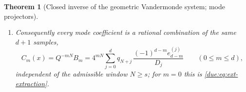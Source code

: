\documentclass[11pt,oneside]{article}
\theoremstyle{plain}
\newtheorem{theorem}{Theorem}[section]
\theoremstyle{definition}
\theoremstyle{remark}
\newcommand{\upn}[1]{\RvachevUp_{#1}}
\newcommand{\Qq}{Q}                                         %
\newcommand{\Cr}[2]{C_{#1}\!\left(#2\right)}                %
\newcommand{\qn}[1]{q_{#1}}                                 %
\begin{document}
\begin{theorem}[Closed inverse of the geometric Vandermonde system; mode projectors]
\begin{enumerate}
\begin{equation}
  =\sum_{a=0}^{m}\sum_{b=0}^{d-m}(-1)^{a+b}\,
  \Qq^{\binom{a}{2}+\binom{b}{2}+(m+1)b}\,
  \GaussianBinomial{m}{a}{\Qq}\GaussianBinomial{d-m}{b}{\Qq}\;
  \qn{N+d-a-b}.
  \label{due:eq:rec-projector-expanded}
 \end{equation}
\item\label{due:it:rec-modes}
 Consequently every mode coefficient is a rational combination of the same
 $d+1$ samples,
 \begin{equation}
  \Cr{m}{x}=\Qq^{-mN}B_{m}
  =4^{mN}\sum_{j=0}^{d}\qn{N+j}\,\frac{(-1)^{d-m}e^{(j)}_{d-m}}{D_{j}}
  \qquad(0\le m\le d),
  \label{due:eq:rec-modes}
 \end{equation}
 independent of the admissible window $N\ge s$; for $m=0$ this is
 \cref{due:eq:ext-extraction}.
\end{enumerate}
\end{theorem}
\end{document}

